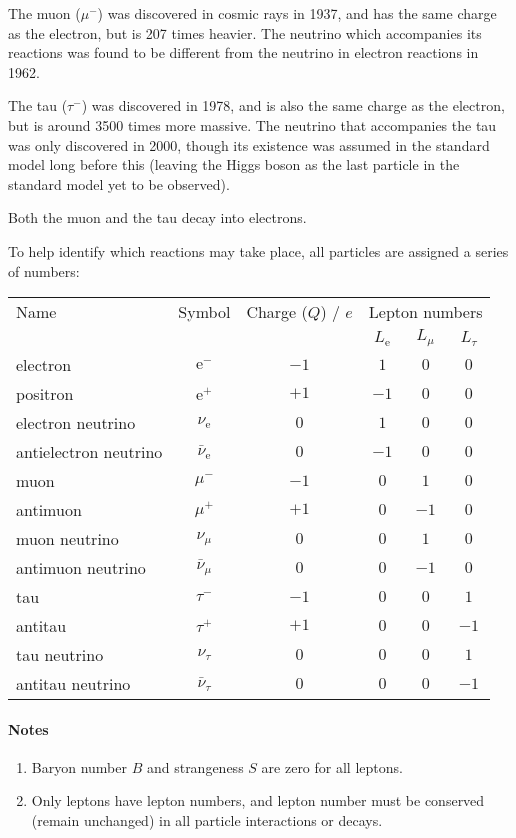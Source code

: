 \documentclass[a4paper,12pt]{article}
\begin{document}
The muon ($\mu^{-}$) was discovered in cosmic rays in 1937, and has the same charge as the electron, but is 207 times heavier.  The neutrino which accompanies its reactions was found to be different from the neutrino in electron reactions in 1962.

The tau ($\tau^{-}$) was discovered in 1978, and is also the same charge as the electron, but is around 3500 times more massive.  The neutrino that accompanies the tau was only discovered in 2000, though its existence was assumed in the standard model long before this (leaving the Higgs boson as the last particle in the standard model yet to be observed).

Both the muon and the tau decay into electrons.

To help identify which reactions may take place, all particles are assigned a series of numbers:\\

\begin{tabular}{lccccc}
\hline
\hline
Name & Symbol & Charge ($Q$) / $e$ & \multicolumn{3}{c}{Lepton numbers}\\
&&&$L_{\mathrm{e}}$&$L_{\mu}$&$L_{\tau}$\\
\cline{4-6}
\hline
electron & $\mathrm{e}^{-}$ & $-1$ & $1$ & $0$ & $0$\\
positron & $\mathrm{e}^{+}$ & $+1$ & $-1$ & $0$ & $0$\\
electron neutrino & $\nu_{\mathrm{e}}$ & $0$ & $1$ & $0$ & $0$\\
antielectron neutrino & $\bar{\nu}_{\mathrm{e}}$ & $0$ & $-1$ & $0$ & $0$\\
\hline
muon & $\mu^{-}$ & $-1$ & $0$ & $1$ & $0$\\
antimuon & $\mu^{+}$ & $+1$ & $0$ & $-1$ & $0$\\
muon neutrino & $\nu_{\mu}$ & $0$ & $0$ & $1$ & $0$\\
antimuon neutrino & $\bar{\nu}_{\mu}$ & $0$ & $0$ & $-1$ & $0$\\
\hline
tau & $\tau^{-}$ & $-1$ & $0$ & $0$ & $1$\\
antitau & $\tau^{+}$ & $+1$ & $0$ & $0$ & $-1$\\
tau neutrino & $\nu_{\tau}$ & $0$ & $0$ & $0$ & $1$\\
antitau neutrino & $\bar{\nu}_{\tau}$ & $0$ & $0$ & $0$ & $-1$\\
\hline
\hline
\end{tabular}

\paragraph{Notes}\begin{enumerate}
\item Baryon number $B$ and strangeness $S$ are zero for all leptons.
\item Only leptons have lepton numbers, and lepton number must be conserved (remain unchanged) in all particle interactions or decays.
\end{enumerate}
\end{document}
